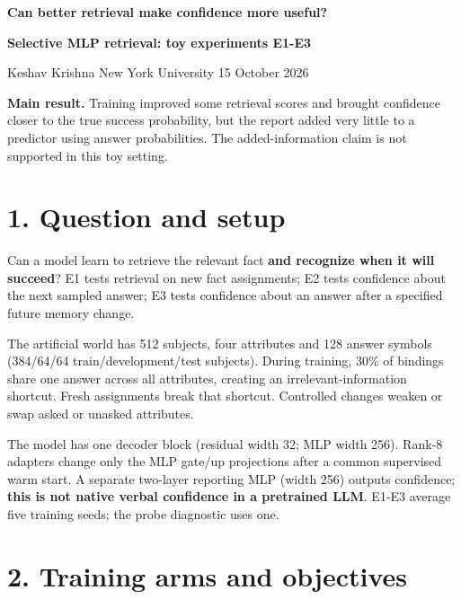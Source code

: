 \documentclass[10pt,a4paper]{article}
\begin{document}
\fontsize{10}{11.7}\selectfont
\setlength{\abovedisplayskip}{4pt}
\setlength{\belowdisplayskip}{4pt}


{\bfseries\fontsize{18}{21}\selectfont\color{ink} Can better retrieval make confidence more useful?\par}\vspace{3pt}

{\small \textbf{Selective MLP retrieval: toy experiments E1-E3}\par}

Keshav Krishna \textperiodcentered{} New York University \textperiodcentered{} 15 October 2026
\par

\textbf{Main result.} Training improved some retrieval scores and brought confidence closer to the true success probability, but the report added very little to a predictor using answer probabilities. The added-information claim is not supported in this toy setting.
\par

\section*{1. Question and setup}

Can a model learn to retrieve the relevant fact \textbf{and recognize when it will succeed}? E1 tests retrieval on new fact assignments; E2 tests confidence about the next sampled answer; E3 tests confidence about an answer after a specified future memory change.
\par

The artificial world has 512 subjects, four attributes and 128 answer symbols (384/64/64 train/development/test subjects). During training, 30\% of bindings share one answer across all attributes, creating an irrelevant-information shortcut. Fresh assignments break that shortcut. Controlled changes weaken or swap asked or unasked attributes.
\par

The model has one decoder block (residual width 32; MLP width 256). Rank-8 adapters change only the MLP gate/up projections after a common supervised warm start. A separate two-layer reporting MLP (width 256) outputs confidence; \textbf{this is not native verbal confidence in a pretrained LLM}. E1-E3 average five training seeds; the probe diagnostic uses one.
\par

\section*{2. Training arms and objectives}
\end{document}
